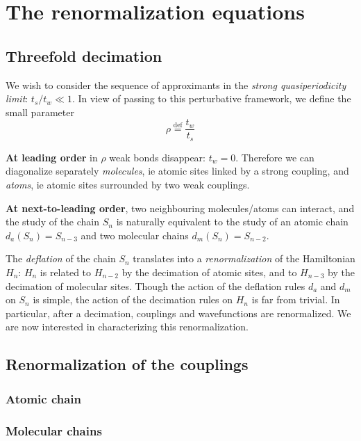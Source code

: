\documentclass[11pt]{article}
\newcommand{\define}{\ensuremath{ \overset{\text{def}}{=} }}
\begin{document}
\section{The renormalization equations}

\subsection{Threefold decimation}
We wish to consider the sequence of approximants in the \textit{strong quasiperiodicity limit}: $t_s/t_w \ll 1$.
In view of passing to this perturbative framework, we define the small parameter
\begin{equation}
	\rho \define \frac{t_w}{t_s}
\end{equation}

\textbf{At leading order} in $\rho$ weak bonds disappear: $t_w = 0$. 
Therefore we can diagonalize separately \textit{molecules}, ie atomic sites linked by a strong coupling, and \textit{atoms}, ie atomic sites surrounded by two weak couplings.

\textbf{At next-to-leading order}, two neighbouring molecules/atoms can interact, and the study of the chain $S_n$ is naturally equivalent to the study of an atomic chain $d_a(S_n) = S_{n-3}$ and two molecular chains $d_m(S_n) = S_{n-2}$. 

The \textit{deflation} of the chain $S_n$ translates into a \textit{renormalization} of the Hamiltonian $H_n$: $H_n$ is related to $H_{n-2}$ by the decimation of atomic sites, and to $H_{n-3}$ by the decimation of molecular sites. 
Though the action of the deflation rules $d_a$ and $d_m$ on $S_n$ is simple, the action of the decimation rules on $H_n$ is far from trivial.
In particular, after a decimation, couplings and wavefunctions are renormalized. We are now interested in characterizing this renormalization.

\subsection{Renormalization of the couplings}

\subsubsection{Atomic chain}

\subsubsection{Molecular chains}
\end{document}
